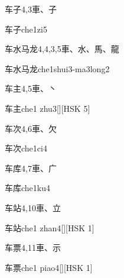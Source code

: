 \begin{entry}{车子}{4,3}{⾞、⼦}
  \begin{phonetics}{车子}{che1zi5}
  \end{phonetics}
\end{entry}

\begin{entry}{车水马龙}{4,4,3,5}{⾞、⽔、⾺、⿓}
  \begin{phonetics}{车水马龙}{che1shui3-ma3long2}
  \end{phonetics}
\end{entry}

\begin{entry}{车主}{4,5}{⾞、⼂}
  \begin{phonetics}{车主}{che1 zhu3}[][HSK 5]
  \end{phonetics}
\end{entry}

\begin{entry}{车次}{4,6}{⾞、⽋}
  \begin{phonetics}{车次}{che1ci4}
  \end{phonetics}
\end{entry}

\begin{entry}{车库}{4,7}{⾞、⼴}
  \begin{phonetics}{车库}{che1ku4}
  \end{phonetics}
\end{entry}

\begin{entry}{车站}{4,10}{⾞、⽴}
  \begin{phonetics}{车站}{che1 zhan4}[][HSK 1]
  \end{phonetics}
\end{entry}

\begin{entry}{车票}{4,11}{⾞、⽰}
  \begin{phonetics}{车票}{che1 piao4}[][HSK 1]
  \end{phonetics}
\end{entry}

